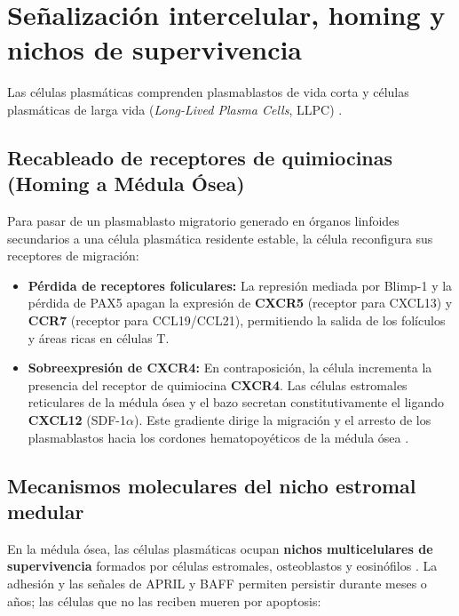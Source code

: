 \section{Señalización intercelular, homing y nichos de supervivencia}

Las células plasmáticas comprenden plasmablastos de vida corta y células plasmáticas de larga vida (\emph{Long-Lived Plasma Cells}, LLPC) \parencite{radbruch2006competence}.

\subsection{Recableado de receptores de quimiocinas (Homing a Médula Ósea)}
Para pasar de un plasmablasto migratorio generado en órganos linfoides secundarios a una célula plasmática residente estable, la célula reconfigura sus receptores de migración:
\begin{itemize}
	\item \textbf{Pérdida de receptores foliculares:} La represión mediada por Blimp-1 y la pérdida de PAX5 apagan la expresión de \textbf{CXCR5} (receptor para CXCL13) y \textbf{CCR7} (receptor para CCL19/CCL21), permitiendo la salida de los folículos y áreas ricas en células T.
	\item \textbf{Sobreexpresión de CXCR4:} En contraposición, la célula incrementa la presencia del receptor de quimiocina \textbf{CXCR4}. Las células estromales reticulares de la médula ósea y el bazo secretan constitutivamente el ligando \textbf{CXCL12} (SDF-1$\alpha$). Este gradiente dirige la migración y el arresto de los plasmablastos hacia los cordones hematopoyéticos de la médula ósea \parencite{radbruch2006competence,tellier2019plasma}.
\end{itemize}

\subsection{Mecanismos moleculares del nicho estromal medular}
En la médula ósea, las células plasmáticas ocupan \textbf{nichos multicelulares de supervivencia} formados por células estromales, osteoblastos y eosinófilos \parencite{radbruch2006competence}. La adhesión y las señales de APRIL y BAFF permiten persistir durante meses o años; las células que no las reciben mueren por apoptosis:


